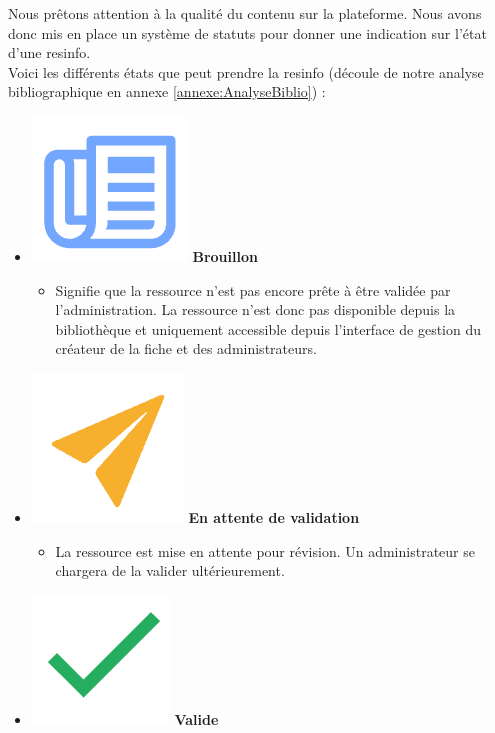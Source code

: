 Nous prêtons attention à la qualité du contenu sur la plateforme. Nous avons donc mis en place un système de statuts pour donner une indication sur l'état d'une \gls{resinfo}.\\

Voici les différents états que peut prendre la \gls{resinfo} (découle de notre analyse bibliographique en annexe \ref{annexe:AnalyseBiblio}) :

\begin{itemize}
    \item \includegraphics[valign=b,height=1.4\fontcharht\font`X]{images/client/draft.png} \textbf{Brouillon}
    \begin{itemize}
        \item Signifie que la ressource n'est pas encore prête à être validée par l'administration. La ressource n'est donc pas disponible depuis la bibliothèque et uniquement accessible depuis l'interface de gestion du créateur de la \gls{fiche} et des administrateurs.
    \end{itemize}
    \item \includegraphics[valign=b,height=1.4\fontcharht\font`X]{images/client/pending.png} \textbf{En attente de validation}
    \begin{itemize}
        \item La ressource est mise en attente pour révision. Un administrateur se chargera de la valider ultérieurement.
    \end{itemize}
    \item \includegraphics[valign=b,height=1.4\fontcharht\font`X]{images/client/validated.png} \textbf{Valide}

\end{itemize}
